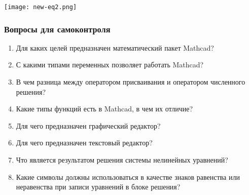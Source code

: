 \begin{center}
	\texttt{[image: new-eq2.png]}
\end{center}


\subsubsection*{Вопросы для самоконтроля}
\begin{enumerate}
	\item Для каких целей предназначен математический пакет Mathcad?
	\item С какими типами переменных позволяет работать Mathcad?
	\item В чем разница между оператором присваивания и оператором численного решения?
	\item Какие типы функций есть в Mathcad, в чем их отличие?
	\item Для чего предназначен графический редактор?
	\item Для чего предназначен текстовый редактор?
	\item Что является результатом решения системы нелинейных уравнений?
	\item Какие символы должны использоваться в качестве знаков равенства или неравенства при записи уравнений в блоке решения?
\end{enumerate}



